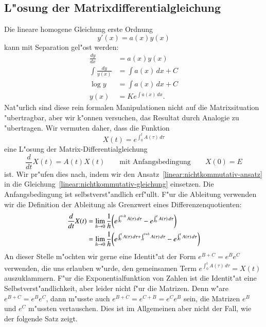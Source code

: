 \subsection{L"osung der Matrixdifferentialgleichung}
Die lineare homogene Gleichung erste Ordnung
\[
y'(x)=a(x)y(x)
\]
kann mit Separation gel"ost werden:
\begin{align*}
\frac{dy}{dx}&=a(x)y(x)
\\
\int\frac{dy}{y(x)}&=\int a(x)\,dx+C
\\
\log y &= \int a(x)\,dx + C
\\
y(x)&=Ke^{\int a(x)\,dx}.
\end{align*}
Nat"urlich sind diese rein formalen Manipulationen nicht auf die
Matrixsituation "ubertragbar, aber wir k"onnen versuchen, das Resultat
durch Analogie zu "ubertragen.
Wir vermuten daher, dass die Funktion
\begin{equation}
X(t)=e^{\int_0^tA(\tau)\,d\tau}
\label{linear:nichtkommutativ-ansatz}
\end{equation}
eine L"osung der Matrix-Differentialgleichung
\begin{equation}
\frac{d}{dt}X(t)=A(t)X(t)\qquad\text{mit Anfangsbedingung}\qquad X(0)=E
\label{linear:nichtkommutativ-gleichung}
\end{equation}
ist.
Wir pr"ufen dies nach, indem wir den
Ansatz~\eqref{linear:nichtkommutativ-ansatz}
in die Gleichung~\eqref{linear:nichtkommutativ-gleichung} einsetzen.
Die Anfangsbedingung ist selbstverst"andlich erf"ullt.
F"ur die Ableitung verwenden wir die Definition der Ableitung als
Grenzwert eines Differenzenquotienten:
\begin{align}
\frac{d}{dt}X(t)
&=
\lim_{h\to 0}\frac1h\biggl(e^{\int_0^{t+h}A(\tau)\,d\tau}
-
e^{\int_0^tA(\tau)\,d\tau}\biggr)
\notag
\\
&=
\lim_{h\to 0}\frac1h\biggl(
e^{\int_0^tA(\tau)\,d\tau
+
\int_t^{t+h}A(\tau)\,d\tau}
-
e^{\int_0^tA(\tau)\,d\tau}\biggr)
\label{linear:nichtkommutativ-diffquot}
\end{align}
An dieser Stelle m"ochten wir gerne eine Identit"at der Form $e^{B+C}=e^Be^C$
verwenden, die uns erlauben w"urde, den gemeinsamen Term
$e^{\int_0^tA(\tau)\,d\tau}=X(t)$ auszuklammern.
F"ur die Exponentialfunktion von Zahlen ist die Identit"at eine
Selbstverst"andlichkeit, aber leider nicht f"ur die Matrizen.
Denn w"are $e^{B+C}=e^Be^C$, dann m"usste auch $e^{B+C}=e^{C+B}=e^Ce^B$
sein, die Matrizen $e^B$ und $e^C$ m"ussten vertauschen.
Dies ist im Allgemeinen aber nicht der Fall, wie der folgende
Satz zeigt.

